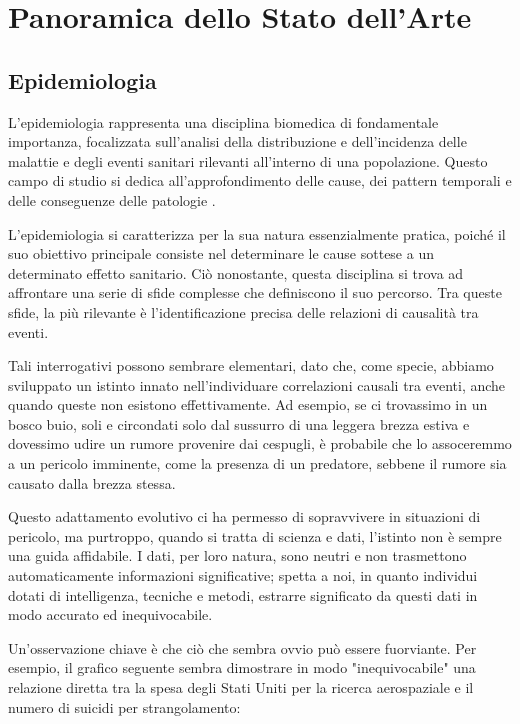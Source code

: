 \section{Panoramica dello Stato dell'Arte}

\subsection{Epidemiologia}
L'epidemiologia rappresenta una disciplina biomedica di fondamentale 
importanza, focalizzata sull'analisi della distribuzione e dell'incidenza 
delle malattie e degli eventi sanitari rilevanti all'interno di una 
popolazione. Questo campo di studio si dedica all'approfondimento 
delle cause, dei pattern temporali e delle conseguenze delle patologie 
\cite{Galea2009-lj} \cite{Parascandola2001-kw}.

L'epidemiologia si caratterizza per la sua natura essenzialmente 
pratica, poiché il suo obiettivo principale consiste nel determinare 
le cause sottese a un determinato effetto sanitario. Ciò nonostante, 
questa disciplina si trova ad affrontare una serie di sfide complesse 
che definiscono il suo percorso. Tra queste sfide, la più rilevante è 
l'identificazione precisa delle relazioni di causalità tra eventi.

Tali interrogativi possono sembrare elementari, dato che, come specie, 
abbiamo sviluppato un istinto innato nell'individuare correlazioni 
causali tra eventi, anche quando queste non esistono effettivamente. 
Ad esempio, se ci trovassimo in un bosco buio, soli e circondati 
solo dal sussurro di una leggera brezza estiva e dovessimo udire un 
rumore provenire dai cespugli, è probabile che lo assoceremmo a un 
pericolo imminente, come la presenza di un predatore, sebbene il 
rumore sia causato dalla brezza stessa.

Questo adattamento evolutivo ci ha permesso di sopravvivere in 
situazioni di pericolo, ma purtroppo, quando si tratta di scienza e dati, 
l'istinto non è sempre una guida affidabile. I dati, per loro natura, 
sono neutri e non trasmettono automaticamente informazioni significative; 
spetta a noi, in quanto individui dotati di intelligenza, 
tecniche e metodi, estrarre significato da questi dati in modo accurato 
ed inequivocabile.

Un'osservazione chiave è che ciò che sembra ovvio può essere fuorviante. 
Per esempio, il grafico seguente sembra dimostrare in modo 
"inequivocabile" una relazione diretta tra la spesa degli Stati Uniti 
per la ricerca aerospaziale e il numero di suicidi per strangolamento:

